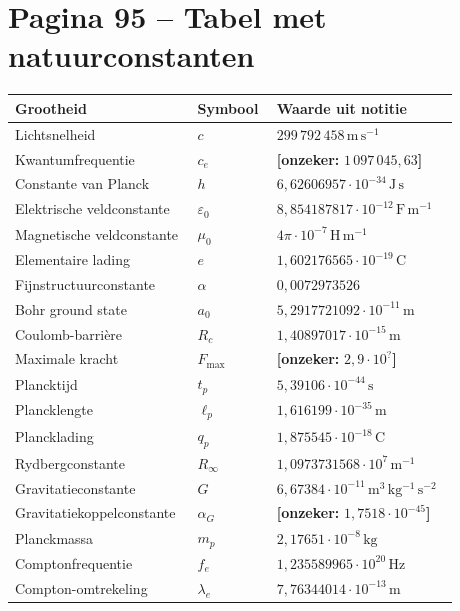 \documentclass[11pt,a4paper]{article}
\newcommand{\onzeker}[1]{\ifmmode\text{\color{red!70!black}\bfseries[onzeker]}\else\textcolor{red!70!black}{\textbf{[onzeker:} #1\textbf{]}}\fi}
\begin{document}
\section*{Pagina 95 -- Tabel met natuurconstanten}

\begin{longtable}{>{\raggedright\arraybackslash}p{0.36\linewidth} >{\centering\arraybackslash}p{0.17\linewidth} >{\raggedright\arraybackslash}p{0.35\linewidth}}
\toprule
Grootheid & Symbool & Waarde uit notitie\\
\midrule
\endhead
Lichtsnelheid & $c$ & $299\,792\,458\,\mathrm{m\,s^{-1}}$ \\
Kwantumfrequentie & $c_e$ & \onzeker{$1\,097\,045{,}63$} \\
Constante van Planck & $h$ & $6{,}62606957\cdot 10^{-34}\,\mathrm{J\,s}$ \\
Elektrische veldconstante & $\varepsilon_0$ & $8{,}854187817\cdot 10^{-12}\,\mathrm{F\,m^{-1}}$ \\
Magnetische veldconstante & $\mu_0$ & $4\pi\cdot 10^{-7}\,\mathrm{H\,m^{-1}}$ \\
Elementaire lading & $e$ & $1{,}602176565\cdot 10^{-19}\,\mathrm{C}$ \\
Fijnstructuurconstante & $\alpha$ & $0{,}0072973526$ \\
Bohr ground state & $a_0$ & $5{,}2917721092\cdot 10^{-11}\,\mathrm{m}$ \\
Coulomb-barrière & $R_c$ & $1{,}40897017\cdot 10^{-15}\,\mathrm{m}$ \\
Maximale kracht & $F_{\max}$ & \onzeker{$2{,}9\cdot 10^{?}$} \\
Plancktijd & $t_p$ & $5{,}39106\cdot 10^{-44}\,\mathrm{s}$ \\
Plancklengte & $\ell_p$ & $1{,}616199\cdot 10^{-35}\,\mathrm{m}$ \\
Plancklading & $q_p$ & $1{,}875545\cdot 10^{-18}\,\mathrm{C}$ \\
Rydbergconstante & $R_\infty$ & $1{,}0973731568\cdot 10^{7}\,\mathrm{m^{-1}}$ \\
Gravitatieconstante & $G$ & $6{,}67384\cdot 10^{-11}\,\mathrm{m^{3}\,kg^{-1}\,s^{-2}}$ \\
Gravitatiekoppelconstante & $\alpha_G$ & \onzeker{$1{,}7518\cdot 10^{-45}$} \\
Planckmassa & $m_p$ & $2{,}17651\cdot 10^{-8}\,\mathrm{kg}$ \\
Comptonfrequentie & $f_e$ & $1{,}235589965\cdot 10^{20}\,\mathrm{Hz}$ \\
Compton-omtrekeling & $\lambda_e$ & $7{,}76344014\cdot 10^{-13}\,\mathrm{m}$ \\

\end{longtable}
\end{document}
